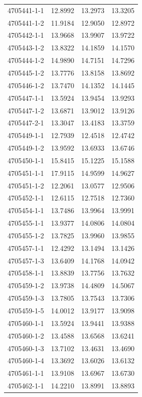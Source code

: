 \begin{longtable}{lrrr}
4705441-1-1 & 12.8992 & 13.2973 & 13.3205 \\
4705441-1-2 & 11.9184 & 12.9050 & 12.8972 \\
4705442-1-1 & 13.9668 & 13.9907 & 13.9722 \\
4705443-1-2 & 13.8322 & 14.1859 & 14.1570 \\
4705444-1-2 & 14.9890 & 14.7151 & 14.7296 \\
4705445-1-2 & 13.7776 & 13.8158 & 13.8692 \\
4705446-1-2 & 13.7470 & 14.1352 & 14.1445 \\
4705447-1-1 & 13.5924 & 13.9454 & 13.9293 \\
4705447-1-2 & 13.6871 & 13.9012 & 13.9126 \\
4705447-2-1 & 13.3047 & 13.4183 & 13.3759 \\
4705449-1-1 & 12.7939 & 12.4518 & 12.4742 \\
4705449-1-2 & 13.9592 & 13.6933 & 13.6746 \\
4705450-1-1 & 15.8415 & 15.1225 & 15.1588 \\
4705451-1-1 & 17.9115 & 14.9599 & 14.9627 \\
4705451-1-2 & 12.2061 & 13.0577 & 12.9506 \\
4705452-1-1 & 12.6115 & 12.7518 & 12.7360 \\
4705454-1-1 & 13.7486 & 13.9964 & 13.9991 \\
4705455-1-1 & 13.9377 & 14.0806 & 14.0804 \\
4705455-1-2 & 13.7825 & 13.9960 & 13.9855 \\
4705457-1-1 & 12.4292 & 13.1494 & 13.1426 \\
4705457-1-3 & 13.6409 & 14.1768 & 14.0942 \\
4705458-1-1 & 13.8839 & 13.7756 & 13.7632 \\
4705459-1-2 & 13.9738 & 14.4809 & 14.5067 \\
4705459-1-3 & 13.7805 & 13.7543 & 13.7306 \\
4705459-1-5 & 14.0012 & 13.9177 & 13.9098 \\
4705460-1-1 & 13.5924 & 13.9441 & 13.9388 \\
4705460-1-2 & 13.4588 & 13.6568 & 13.6241 \\
4705460-1-3 & 13.7102 & 13.4631 & 13.4690 \\
4705460-1-4 & 13.3692 & 13.6026 & 13.6132 \\
4705461-1-1 & 13.9108 & 13.6967 & 13.6730 \\
4705462-1-1 & 14.2210 & 13.8991 & 13.8893 \\

\end{longtable}
